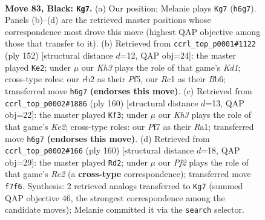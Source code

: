 \documentclass[11pt]{article}
\begin{document}
\clearpage

\begin{figure}[p]\centering
\begin{subfigure}{0.46\textwidth}\centering
\resizebox{\linewidth}{!}{%
\newchessgame
\chessboard[
  setfen={8/5p2/R3p2k/8/P3P3/5PK1/1R6/2r5 b - - 58 83},
  showmover=false,
  pgfstyle=straightmove, color=movearrow, markmove={h6-g7}
]}
\caption{}
\end{subfigure}\hfill
\begin{subfigure}{0.46\textwidth}\centering
\resizebox{\linewidth}{!}{%
\newchessgame
\chessboard[
  setfen={R7/6pk/PB3p2/1p3P2/r6p/8/8/3K4 w - - 0 77},
  showmover=false,
  pgfstyle=straightmove, color=movearrow, markmove={d1-e2}
]}
\caption{}
\end{subfigure}
\\[4pt]
\begin{subfigure}{0.46\textwidth}\centering
\resizebox{\linewidth}{!}{%
\newchessgame
\chessboard[
  setfen={8/8/5k2/6p1/6P1/7p/4KP1r/R7 w - - 2 81},
  showmover=false,
  pgfstyle=straightmove, color=movearrow, markmove={e2-f3}
]}
\caption{}
\end{subfigure}\hfill
\begin{subfigure}{0.46\textwidth}\centering
\resizebox{\linewidth}{!}{%
\newchessgame
\chessboard[
  setfen={8/8/5kp1/7p/5P2/r5PK/4R3/8 w - - 10 81},
  showmover=false,
  pgfstyle=straightmove, color=movearrow, markmove={e2-d2}
]}
\caption{}
\end{subfigure}
\caption{\textbf{Move 83, Black: \texttt{Kg7}.} (a) Our position; Melanie plays \texttt{Kg7} (\texttt{h6g7}). Panels (b)--(d) are the retrieved master positions whose correspondence most drove this move (highest QAP objective among those that transfer to it). (b) Retrieved from \texttt{ccrl\_top\_p0001\#1122} (ply 152) [structural distance $d$=12, QAP obj=24]: the master played \texttt{Ke2}; under $\mu$ our \emph{Kh3} plays the role of that game's \emph{Kd1}; cross-type roles: our \emph{r}b2 as their \emph{P}f5, our \emph{R}c1 as their \emph{B}b6; transferred move \texttt{h6g7} \textbf{(endorses this move)}. (c) Retrieved from \texttt{ccrl\_top\_p0002\#1886} (ply 160) [structural distance $d$=13, QAP obj=22]: the master played \texttt{Kf3}; under $\mu$ our \emph{Kh3} plays the role of that game's \emph{Ke2}; cross-type roles: our \emph{P}f7 as their \emph{R}a1; transferred move \texttt{h6g7} \textbf{(endorses this move)}. (d) Retrieved from \texttt{ccrl\_top\_p0002\#166} (ply 160) [structural distance $d$=18, QAP obj=29]: the master played \texttt{Rd2}; under $\mu$ our \emph{Pf2} plays the role of that game's \emph{Re2} (a \textbf{cross-type} correspondence); transferred move \texttt{f7f6}. Synthesis: 2 retrieved analogs transferred to \texttt{Kg7} (summed QAP objective 46, the strongest correspondence among the candidate moves); Melanie committed it via the \texttt{search} selector.}
\label{fig:thought-m165}
\end{figure}
\end{document}
